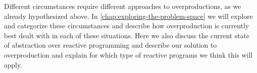 Different circumstances require different approaches to overproductions, as we already hypothesized above. In \autoref{chap:exploring-the-problem-space} we will explore and categorize these circumstances and describe how overproduction is currently best dealt with in each of these situations. Here we also discuss the current state of abstraction over reactive programming and describe our solution to overproduction and explain for which type of reactive programs we think this will apply.


